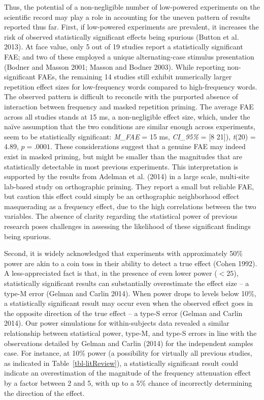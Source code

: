 \documentclass[
]{interact}
\begin{document}
Thus, the potential of a non-negligible number of low-powered
experiments on the scientific record may play a role in accounting for
the uneven pattern of results reported thus far. First, if low-powered
experiments are prevalent, it increases the risk of observed
statistically significant effects being spurious (Button et al. 2013).
At face value, only 5 out of 19 studies report a statistically
significant FAE; and two of these employed a unique alternating-case
stimulus presentation (Bodner and Masson 2001; Masson and Bodner 2003).
While reporting non-significant FAEs, the remaining 14 studies still
exhibit numerically larger repetition effect sizes for low-frequency
words compared to high-frequency words. The observed pattern is
difficult to reconcile with the purported absence of interaction between
frequency and masked repetition priming. The average FAE across all
studies stands at 15 ms, a non-negligible effect size, which, under the
naïve assumption that the two conditions are similar enough across
experiments, seem to be statistically significant: \emph{M\_FAE} = 15
ms, \emph{CI\_95\%} = {[}8 21{]}), \emph{t}(20) = 4.89, \(p=.0001\).
These considerations suggest that a genuine FAE may indeed exist in
masked priming, but might be smaller than the magnitudes that are
statistically detectable in most previous experiments. This
interpretation is supported by the results from Adelman et al. (2014) in
a large scale, multi-site lab-based study on orthographic priming. They
report a small but reliable FAE, but caution this effect could simply be
an orthographic neighborhood effect masquerading as a frequency effect,
due to the high correlations between the two variables. The absence of
clarity regarding the statistical power of previous research poses
challenges in assessing the likelihood of these significant findings
being spurious.

Second, it is widely acknowledged that experiments with approximately
50\% power are akin to a coin toss in their ability to detect a true
effect (Cohen 1992). A less-appreciated fact is that, in the presence of
even lower power (\(<25%
\)), statistically significant results can substantially overestimate
the effect size -- a type-M error (Gelman and Carlin 2014). When power
drops to levels below 10\%, a statistically significant result may occur
even when the observed effect goes in the opposite direction of the true
effect -- a type-S error (Gelman and Carlin 2014). Our power simulations
for within-subjects data revealed a similar relationship between
statistical power, type-M, and type-S errors in line with the
observations detailed by Gelman and Carlin (2014) for the independent
samples case. For instance, at 10\% power (a possibility for virtually
all previous studies, as indicated in Table~\ref{tbl-litReview}), a
statistically significant result could indicate an overestimation of the
magnitude of the frequency attenuation effect by a factor between 2 and
5, with up to a 5\% chance of incorrectly determining the direction of
the effect.
\end{document}
